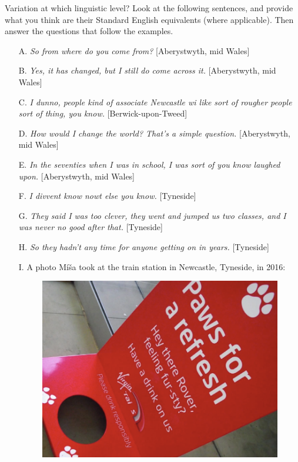 \begin{exercises}{Variation at which linguistic level?}\label{exercise-variation}
Look at the following sentences, and provide what you think are their Standard English equivalents (where applicable). Then answer the questions that follow the examples.
\begin{itemize}
    \item[A.]\textit{So from where do you come from?} [Aberystwyth, mid Wales]
    \item[B.]\textit{Yes, it has changed, but I still do come across it.} [Aberystwyth, mid Wales]
    \item[C.]\textit{I dunno, people kind of associate Newcastle wi like sort of rougher people sort of thing, you know.} [Berwick-upon-Tweed]
    \item[D.]\textit{How would I change the world? That's a simple question.} [Aberystwyth, mid Wales]
    \item[E.]\textit{In the seventies when I was in school, I was sort of you know laughed upon.} [Aberystwyth, mid Wales]
    \item[F.]\textit{I divvent know nowt else you know.} [Tyneside]
    \item[G.]\textit{They said I was too clever, they went and jumped us two classes, and I was never no good after that.} [Tyneside]
    \item[H.]\textit{So they hadn't any time for anyone getting on in years.} [Tyneside]
    \item[I.]A photo Míša took at the train station in Newcastle, Tyneside, in 2016:
    \begin{figure}[H]
        \centering
        \includegraphics[scale=0.3]{chapters/img/Paws_for_a_refresh.png}
        \label{fig:paws}
    \end{figure}
\end{itemize}


\end{exercises}
